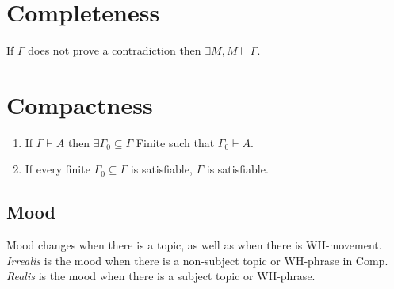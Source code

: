 \documentclass[12pt]{article}
\begin{document}
\section{Completeness}

If $\Gamma$ does not prove a contradiction then $\exists M,
M \vdash \Gamma$.

\section{Compactness}

\begin{enumerate}

\item If $\Gamma \vdash A$ then $\exists \Gamma_0 \subseteq
\Gamma$ Finite such that $\Gamma_0 \vdash A$.

\item If every finite $\Gamma_0 \subseteq \Gamma$ is satisfiable,
$\Gamma$ is satisfiable.

\end{enumerate}

\subsection{Mood}

Mood changes when there is a topic, as well as when
there is WH-movement.  \emph{Irrealis} is the mood when
there is a non-subject topic or WH-phrase in Comp.
\emph{Realis} is the mood when there is a subject topic
or WH-phrase.
\end{document}
